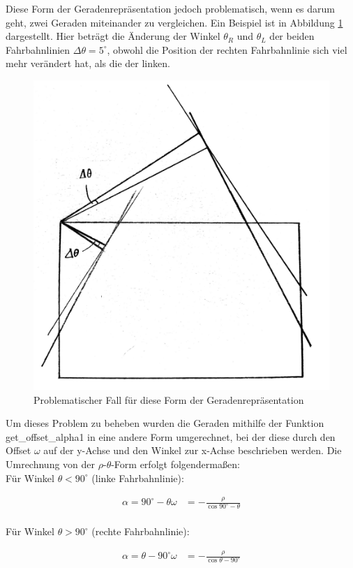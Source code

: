 	Diese Form der Geradenrepräsentation jedoch problematisch, wenn es darum geht, zwei Geraden miteinander zu vergleichen. Ein Beispiel ist in Abbildung \ref{fig:rho_theta2} dargestellt. Hier beträgt die Änderung der Winkel $\theta_R$ und $\theta_L$ der beiden Fahrbahnlinien $\Delta\theta=5^\circ$, obwohl die Position der rechten Fahrbahnlinie sich viel mehr verändert hat, als die der linken.
	
	
	
	\begin{figure}[H]
		\centering
		\includegraphics[width=.5\linewidth]{images/rho_theta2.jpg}
		\caption{Problematischer Fall für diese Form der Geradenrepräsentation}
		\label{fig:rho_theta2}
	\end{figure}

	Um dieses Problem zu beheben wurden die Geraden mithilfe der Funktion get\_offset\_alpha1 in eine andere Form umgerechnet, bei der diese durch den Offset $\omega$ auf der y-Achse und den Winkel zur x-Achse beschrieben werden. Die Umrechnung von der $\rho$-$\theta$-Form erfolgt folgendermaßen:\\

	
	
	Für Winkel $\theta<90^\circ$ (linke Fahrbahnlinie):
	
	\begin{align*}
	\alpha=90^{\circ}-\theta
	\omega&=-\frac{\rho}{\cos{90^{\circ}-\theta}} \\
	\end{align*}
	
	Für Winkel $\theta>90^\circ$ (rechte Fahrbahnlinie):
	
	\begin{align*}
	\alpha=\theta-90^{\circ}
	\omega&=-\frac{\rho}{\cos{\theta-90^{\circ}}} \\
	\end{align*}
	
